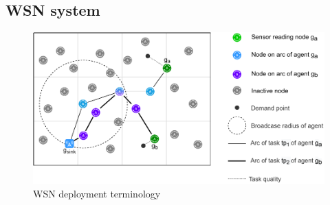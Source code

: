 \subsection{WSN system}

\begin{figure}
\centering 
\includegraphics[width=0.7\linewidth]{grid_concept}
\caption[WSN deployment terminology]{WSN deployment terminology}
\label{fig:gridconcept}
\end{figure}
